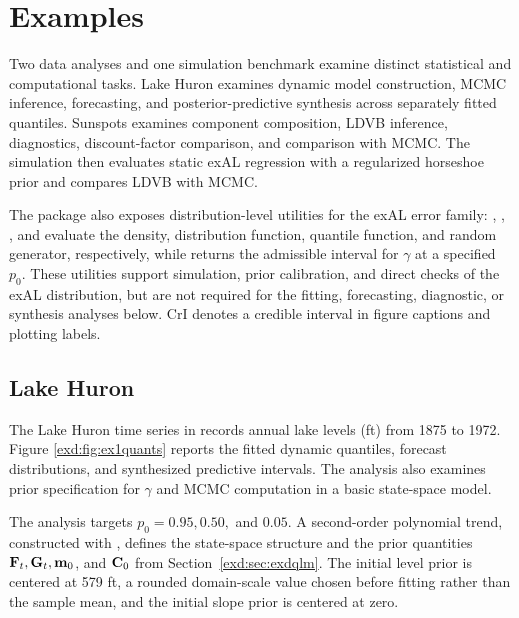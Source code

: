 \section{Examples}
 \label{exd:sec:exs}


Two data analyses and one simulation benchmark examine distinct statistical
and computational tasks. Lake Huron examines dynamic model construction, MCMC
inference, forecasting, and posterior-predictive synthesis across separately
fitted quantiles. Sunspots examines component composition, LDVB inference,
diagnostics, discount-factor comparison, and comparison with MCMC. The
simulation then evaluates static exAL regression with a regularized horseshoe
prior and compares LDVB with MCMC.

The package also exposes distribution-level utilities for the exAL error family:
, , , and  evaluate the
density, distribution function, quantile function, and random generator,
respectively, while  returns the admissible interval
for $\gamma$ at a specified \(p_0\). These utilities support simulation, prior
calibration, and direct checks of the exAL distribution, but are not required
for the fitting, forecasting, diagnostic, or synthesis analyses below. CrI
denotes a credible interval in figure captions and plotting labels.


\subsection{Lake Huron}
\label{exd:sec:ex1}

The Lake Huron time series in  records annual lake levels (ft)
from 1875 to 1972. Figure \ref{exd:fig:ex1quants} reports the fitted dynamic
quantiles, forecast distributions, and synthesized predictive intervals. The
analysis also examines prior specification for $\gamma$ and MCMC computation
in a basic state-space model.

The analysis targets $p_0=0.95,0.50,$ and $0.05$. A second-order polynomial trend, constructed with , defines the state-space structure and the prior quantities $\mathbf{F}_t,\mathbf{G}_t, \mathbf{m}_0$, and $\mathbf{C}_0$ from Section~\ref{exd:sec:exdqlm}. The initial level prior is centered at 579 ft, a rounded domain-scale value chosen before fitting rather than the sample mean, and the initial slope prior is centered at zero.


